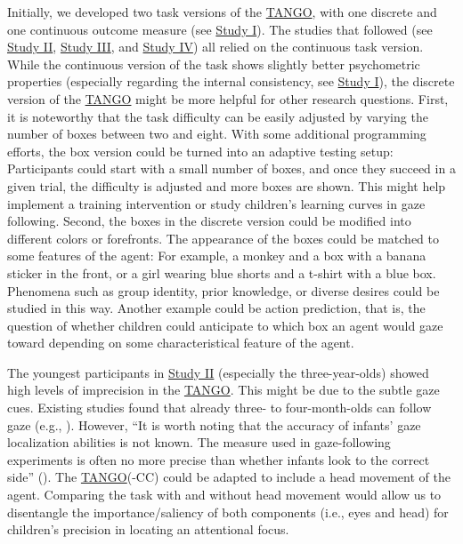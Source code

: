 \documentclass[
]{scrbook}
\begin{document}
Initially, we developed two task versions of the \hyperref[acronyms_TANGO]{TANGO}, with one discrete and one continuous outcome measure (see \hyperref[studyI]{Study I}). The studies that followed (see \hyperref[studyII]{Study II}, \hyperref[studyIII]{Study III}, and \hyperref[studyIV]{Study IV}) all relied on the continuous task version. While the continuous version of the task shows slightly better psychometric properties (especially regarding the internal consistency, see \hyperref[studyI]{Study I}), the discrete version of the \hyperref[acronyms_TANGO]{TANGO} might be more helpful for other research questions. First, it is noteworthy that the task difficulty can be easily adjusted by varying the number of boxes between two and eight. With some additional programming efforts, the box version could be turned into an adaptive testing setup: Participants could start with a small number of boxes, and once they succeed in a given trial, the difficulty is adjusted and more boxes are shown. This might help implement a training intervention or study children's learning curves in gaze following. Second, the boxes in the discrete version could be modified into different colors or forefronts. The appearance of the boxes could be matched to some features of the agent: For example, a monkey and a box with a banana sticker in the front, or a girl wearing blue shorts and a t-shirt with a blue box. Phenomena such as group identity, prior knowledge, or diverse desires could be studied in this way. Another example could be action prediction, that is, the question of whether children could anticipate to which box an agent would gaze toward depending on some characteristical feature of the agent.

The youngest participants in \hyperref[studyII]{Study II} (especially the three-year-olds) showed high levels of imprecision in the \hyperref[acronyms_TANGO]{TANGO}. This might be due to the subtle gaze cues. Existing studies found that already three- to four-month-olds can follow gaze (e.g., ). However, ``It is worth noting that the accuracy of infants' gaze localization abilities is not known. The measure used in gaze-following experiments is often no more precise than whether infants look to the correct side'' (). The \hyperref[acronyms_TANGO]{TANGO}(-CC) could be adapted to include a head movement of the agent. Comparing the task with and without head movement would allow us to disentangle the importance/saliency of both components (i.e., eyes and head) for children's precision in locating an attentional focus.
\end{document}
